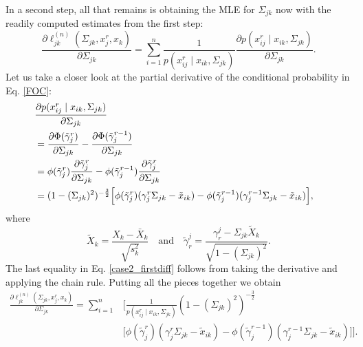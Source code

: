 In a second step, all that remains is obtaining the MLE for $\Sigma_{jk}$ now with the readily computed estimates from the first step:
\begin{equation}\label{FOC}
    \frac{\partial \ell_{jk}^{(n)}(\Sigma_{jk}, x_j^r,x_k)}{\partial \Sigma_{jk}} = \sum_{i=1}^n \frac{1}{p(x_{ij}^{r} \mid x_{ik}, \Sigma_{jk})} \frac{\partial p(x_{ij}^{r} \mid x_{ik}, \Sigma_{jk})}{\partial \Sigma_{jk}}.
\end{equation}
Let us take a closer look at the partial derivative of the conditional probability in Eq. \eqref{FOC}:
\begin{equation}\label{case2_firstdiff}
    \begin{split}
        \lefteqn{\frac{\partial p(x_{ij}^{r} \mid x_{ik}, \Sigma_{jk})}{\partial \Sigma_{jk}}} \\
        &= \frac{\partial \Phi({\tilde{\gamma}}_j^{r})}{\partial \Sigma_{jk}} - \frac{\partial\Phi({\tilde{\gamma}}_j^{r-1})}{\partial \Sigma_{jk}} \\
        &= \phi({\tilde{\gamma}}_j^{r})\frac{\partial {\tilde{\gamma}}_j^{r}}{\partial\Sigma_{jk}} - \phi({\tilde{\gamma}}_j^{r-1})\frac{\partial {\tilde{\gamma}}_j^{r}}{\partial\Sigma_{jk}} \\
        &= (1-(\Sigma_{jk})^2)^{-\frac{3}{2}}\Big[\phi({\tilde{\gamma}}_j^{r})({\gamma}_j^r\Sigma_{jk} - {\tilde{x}}_{ik}) - \phi({\tilde{\gamma}}_j^{r-1})({\gamma}_j^{r-1}\Sigma_{jk} - {\tilde{x}}_{ik})\Big],
    \end{split}
\end{equation}
where
\[{\tilde{X}}_{k} = \frac{X_{k} - \bar{X}_k}{\sqrt{s_k^2}} \quad \text{and} \quad {\tilde{\gamma}}^j_{r} = \frac{{\gamma}^j_{r} - \Sigma_{jk}{\tilde{X}}_k}{\sqrt{1-(\Sigma_{jk})^2}}.\]
The last equality in Eq. \eqref{case2_firstdiff} follows from taking the derivative and applying the chain rule. Putting all the pieces together we obtain
\begin{equation}\label{MLE_polyserial}
    \begin{split}
        \frac{\partial\ell_{jk}^{(n)}(\Sigma_{jk}, x_j^r,x_k)}{\partial \Sigma_{jk}} = \sum_{i=1}^n &\Bigg[\frac{1}{p(x_{ij}^{r} \mid x_{ik}, \Sigma_{jk})} (1-(\Sigma_{jk})^2)^{-\frac{3}{2}} \\
        &\Big[\phi({\tilde{\gamma}}_j^{r})({\gamma}_j^r\Sigma_{jk} - {\tilde{x}}_{ik}) - \phi({\tilde{\gamma}}_j^{r-1})({\gamma}_j^{r-1}\Sigma_{jk} - {\tilde{x}}_{ik})\Big]\Bigg].
    \end{split}
\end{equation}

